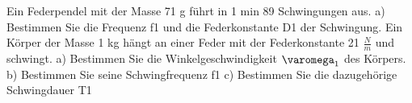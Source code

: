 \documentclass{article}
\begin{document}
Ein Federpendel mit der Masse 71 g führt in 1 min 89 Schwingungen aus.
a) Bestimmen Sie die Frequenz f1 und die Federkonstante D1 der Schwingung.
Ein Körper der Masse 1 kg hängt an einer Feder mit der Federkonstante 21 $\frac{N}{m}$ und schwingt.
a) Bestimmen Sie die Winkelgeschwindigkeit $\varomega _1$ des Körpers.
b) Bestimmen Sie seine Schwingfrequenz f1
c) Bestimmen Sie die dazugehörige Schwingdauer T1
\end{document}
